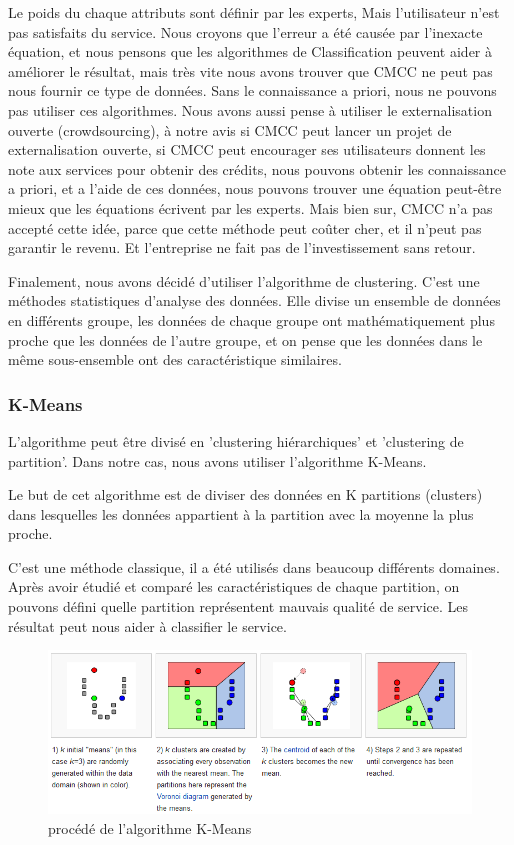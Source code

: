 Le poids du chaque attributs sont définir par les experts, Mais l'utilisateur n'est pas satisfaits du service. Nous croyons que l'erreur a été causée par l'inexacte équation, et nous pensons que les algorithmes de Classification peuvent aider à améliorer le résultat, mais très vite nous avons trouver que CMCC ne peut pas nous fournir ce type de données. Sans le connaissance a priori, nous ne pouvons pas utiliser ces algorithmes. Nous avons aussi pense à utiliser le externalisation ouverte (crowdsourcing), à notre avis si CMCC peut lancer un projet de externalisation ouverte, si CMCC peut encourager ses utilisateurs donnent les note aux services pour obtenir des crédits, nous pouvons obtenir les connaissance a priori, et a l'aide de ces données, nous pouvons trouver une équation peut-être mieux que les équations écrivent par les experts. Mais bien sur, CMCC n'a pas accepté cette idée, parce que cette méthode peut coûter cher, et il n'peut pas garantir le revenu. Et l'entreprise ne fait pas de l'investissement sans retour.

Finalement, nous avons décidé d'utiliser l'algorithme de clustering. C'est une méthodes statistiques d'analyse des données. Elle divise un ensemble de données en différents groupe, les données de chaque groupe ont mathématiquement plus proche que les données de l'autre groupe,  et on pense que les données dans le même sous-ensemble ont des caractéristique similaires.
\subsubsection{K-Means}
L'algorithme peut être divisé en 'clustering hiérarchiques' et 'clustering de partition'. Dans notre cas, nous avons utiliser l'algorithme K-Means. 

Le but de cet algorithme est de diviser des données en K partitions (clusters) dans lesquelles les données appartient à la partition avec la moyenne la plus proche. 

C'est une méthode classique, il a été utilisés dans beaucoup différents domaines. Après avoir étudié et comparé les caractéristiques de chaque partition, on pouvons défini quelle partition représentent mauvais qualité de service. Les résultat peut nous aider à classifier le service. 
\begin{figure}[H]
\centering
\includegraphics[width=0.7\linewidth]{images/kmeans}
\caption{procédé de l'algorithme K-Means}
\label{fig:kmeans}
\end{figure}


